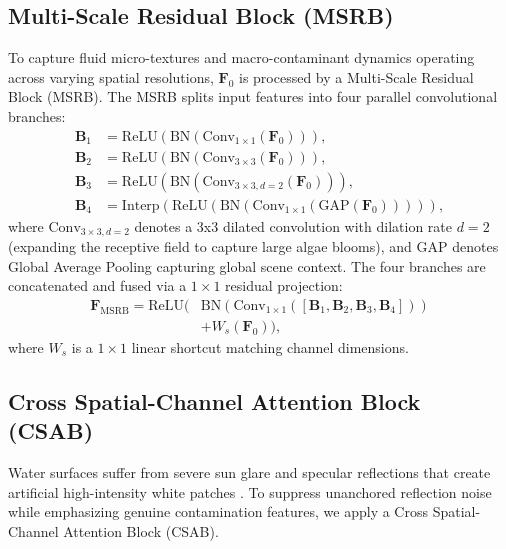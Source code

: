 \documentclass[journal]{IEEEtran}
\begin{document}
\subsection{Multi-Scale Residual Block (MSRB)}
To capture fluid micro-textures and macro-contaminant dynamics operating across varying spatial resolutions, $\mathbf{F}_0$ is processed by a Multi-Scale Residual Block (MSRB). The MSRB splits input features into four parallel convolutional branches:
\begin{align}
\mathbf{B}_1 &= \text{ReLU}(\text{BN}(\text{Conv}_{1 \times 1}(\mathbf{F}_0))), \\
\mathbf{B}_2 &= \text{ReLU}(\text{BN}(\text{Conv}_{3 \times 3}(\mathbf{F}_0))), \\
\mathbf{B}_3 &= \text{ReLU}(\text{BN}(\text{Conv}_{3 \times 3, d=2}(\mathbf{F}_0))), \\
\mathbf{B}_4 &= \text{Interp}(\text{ReLU}(\text{BN}(\text{Conv}_{1 \times 1}(\text{GAP}(\mathbf{F}_0))))),
\end{align}
where $\text{Conv}_{3 \times 3, d=2}$ denotes a 3x3 dilated convolution with dilation rate $d=2$ (expanding the receptive field to capture large algae blooms), and $\text{GAP}$ denotes Global Average Pooling capturing global scene context. The four branches are concatenated and fused via a $1 \times 1$ residual projection:
\begin{equation}
\begin{aligned}
\mathbf{F}_{\text{MSRB}} = \text{ReLU}\big( &\text{BN}(\text{Conv}_{1 \times 1}([\mathbf{B}_1, \mathbf{B}_2, \mathbf{B}_3, \mathbf{B}_4])) \\
&+ W_s(\mathbf{F}_0) \big),
\end{aligned}
\label{eq:msrb_fuse}
\end{equation}
where $W_s$ is a $1 \times 1$ linear shortcut matching channel dimensions.

\subsection{Cross Spatial-Channel Attention Block (CSAB)}
Water surfaces suffer from severe sun glare and specular reflections that create artificial high-intensity white patches \cite{cbam_woo_2018}. To suppress unanchored reflection noise while emphasizing genuine contamination features, we apply a Cross Spatial-Channel Attention Block (CSAB).
\end{document}
